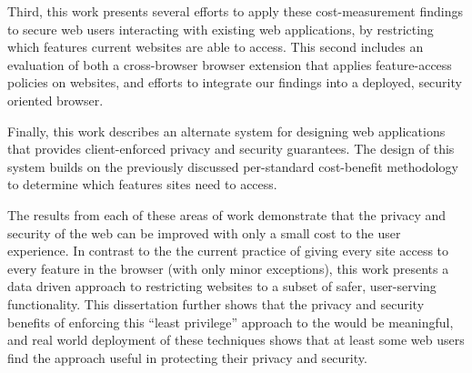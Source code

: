 Third, this work presents several efforts to apply these cost-measurement findings
to secure web users interacting with existing web applications, by restricting
which features current websites are able to access.  This second includes an
evaluation of both a cross-browser browser extension that applies feature-access
policies on websites, and efforts to integrate our findings into a deployed,
security oriented browser.

Finally, this work describes an alternate system for designing
web applications that provides client-enforced privacy and security guarantees.
The design of this system builds on the previously discussed per-standard
cost-benefit methodology to determine which \WAPI features sites need to access.

The results from each of these areas of work demonstrate that the privacy
and security of the web can be improved with only a small cost to the user
experience. In contrast to the the current practice of giving every site access
to every feature in the browser (with only minor exceptions), this work presents
a data driven approach to restricting websites to a subset of safer, user-serving
functionality.  This dissertation further shows that the privacy and security
benefits of enforcing this ``least privilege'' approach to the \WAPI would
be meaningful, and real world deployment of these techniques shows that at
least some web users find the approach useful in protecting their privacy and
security.
